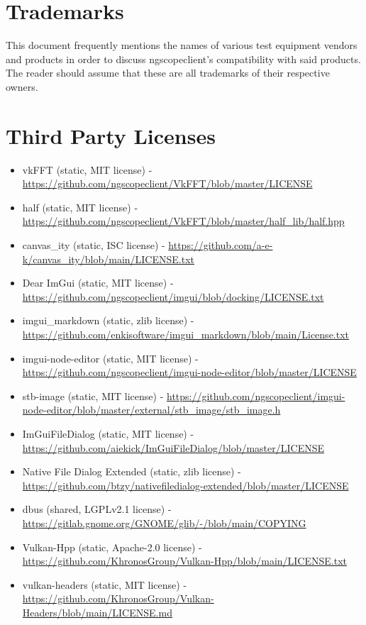 \section{Trademarks}

This document frequently mentions the names of various test equipment vendors and products in order to discuss
ngscopeclient's compatibility with said products. The reader should assume that these are all trademarks of their
respective owners.

\section{Third Party Licenses}

\begin{itemize}
\item vkFFT (static, MIT license) - \url{https://github.com/ngscopeclient/VkFFT/blob/master/LICENSE}
\item half (static, MIT license) - \url{https://github.com/ngscopeclient/VkFFT/blob/master/half_lib/half.hpp}
\item canvas\_ity (static, ISC license) - \url{https://github.com/a-e-k/canvas_ity/blob/main/LICENSE.txt}
\item Dear ImGui (static, MIT license) - \url{https://github.com/ngscopeclient/imgui/blob/docking/LICENSE.txt}
\item imgui\_markdown (static, zlib license) - \url{https://github.com/enkisoftware/imgui_markdown/blob/main/License.txt}
\item imgui-node-editor (static, MIT license) - \url{https://github.com/ngscopeclient/imgui-node-editor/blob/master/LICENSE}
\item stb-image (static, MIT license) - \url{https://github.com/ngscopeclient/imgui-node-editor/blob/master/external/stb_image/stb_image.h}
\item ImGuiFileDialog (static, MIT license) - \url{https://github.com/aiekick/ImGuiFileDialog/blob/master/LICENSE}
\item Native File Dialog Extended (static, zlib license) - \url{https://github.com/btzy/nativefiledialog-extended/blob/master/LICENSE}
\item dbus (shared, LGPLv2.1 license) - \url{https://gitlab.gnome.org/GNOME/glib/-/blob/main/COPYING}
\item Vulkan-Hpp (static, Apache-2.0 license) - \url{https://github.com/KhronosGroup/Vulkan-Hpp/blob/main/LICENSE.txt}
\item vulkan-headers (static, MIT license) - \url{https://github.com/KhronosGroup/Vulkan-Headers/blob/main/LICENSE.md}

\end{itemize}
